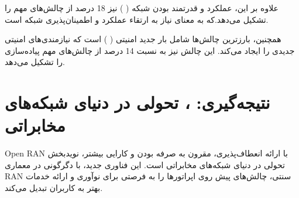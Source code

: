 \documentclass[landscape, 12pt]{report}
\begin{document}
علاوه بر این، عملکرد و قدرتمند بودن شبکه (
) نیز 18 درصد از چالش‌های مهم را تشکیل می‌دهد.که به معنای نیاز به ارتقاء عملکرد و اطمینان‌پذیری شبکه است.

همچنین، بارزترین چالش‌ها شامل بار جدید امنیتی ( 
) است که نیازمندی‌های امنیتی جدیدی را ایجاد می‌کند. این چالش نیز به نسبت 14 درصد از چالش‌های مهم پیاده‌سازی
  را تشکیل می‌دهد.


\chapter*{نتیجه‌گیری: 
	، تحولی در دنیای شبکه‌های مخابراتی}

Open RAN
 با ارائه انعطاف‌پذیری، مقرون به صرفه بودن و کارایی بیشتر، نویدبخش تحولی در دنیای شبکه‌های مخابراتی است. این فناوری جدید، با دگرگونی در معماری
  RAN
   سنتی، چالش‌های پیش روی اپراتورها را به فرصتی برای نوآوری و ارائه خدمات بهتر به کاربران تبدیل می‌کند.
\end{document}
